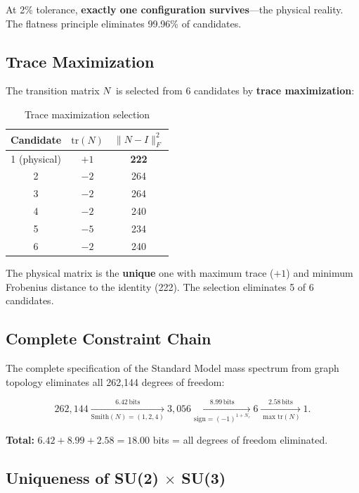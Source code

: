 At 2\% tolerance, \textbf{exactly one configuration survives}---the physical reality. The flatness principle eliminates 99.96\% of candidates.

\subsection{Trace Maximization}\label{sec:trace_maximization}

The transition matrix $N$ is selected from 6 candidates by \textbf{trace maximization}:

\begin{table}[h]
\centering
\caption{Trace maximization selection}
\begin{tabular}{ccc}
\hline\hline
Candidate & $\mathrm{tr}(N)$ & $\|N - I\|_F^2$ \\
\hline
1 (physical) & $+1$ & \textbf{222} \\
2 & $-2$ & 264 \\
3 & $-2$ & 264 \\
4 & $-2$ & 240 \\
5 & $-5$ & 234 \\
6 & $-2$ & 240 \\
\hline\hline
\end{tabular}
\end{table}

The physical matrix is the \textbf{unique} one with maximum trace ($+1$) and minimum Frobenius distance to the identity (222). The selection eliminates 5 of 6 candidates.

\subsection{Complete Constraint Chain}\label{sec:constraint_chain}

The complete specification of the Standard Model mass spectrum from graph topology eliminates all 262,144 degrees of freedom:

\begin{equation}
262{,}144 \xrightarrow[\mathrm{Smith}(N)=(1,2,4)]{6.42\,\mathrm{bits}} 3{,}056 \xrightarrow[\mathrm{sign}=(-1)^{1+N_c}]{8.99\,\mathrm{bits}} 6 \xrightarrow[\max\mathrm{tr}(N)]{2.58\,\mathrm{bits}} 1.
\end{equation}

\textbf{Total:} $6.42 + 8.99 + 2.58 = 18.00$ bits = all degrees of freedom eliminated.

\subsection{Uniqueness of SU(2) $\times$ SU(3)}\label{sec:uniqueness}

